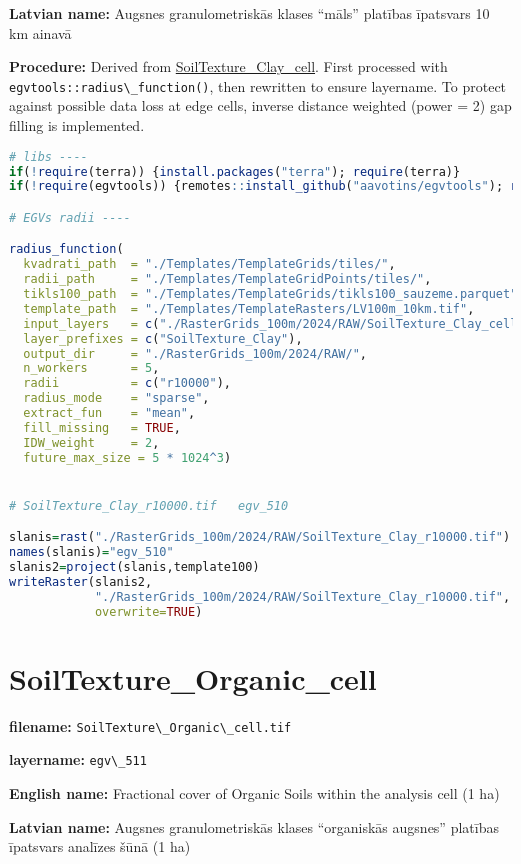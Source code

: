 \documentclass[
]{book}
\newcommand{\passthrough}[1]{#1}
\begin{document}
\textbf{Latvian name:} Augsnes granulometriskās klases ``māls'' platības īpatsvars 10 km ainavā

\textbf{Procedure:} Derived from \hyperref[ch06.506]{SoilTexture\_Clay\_cell}. First processed
with \passthrough{\lstinline!egvtools::radius\_function()!}, then rewritten to ensure layername. To protect against
possible data loss at edge cells, inverse distance weighted (power = 2) gap filling
is implemented.

\begin{lstlisting}[language=R]
# libs ----
if(!require(terra)) {install.packages("terra"); require(terra)}
if(!require(egvtools)) {remotes::install_github("aavotins/egvtools"); require(egvtools)}

# EGVs radii ----

radius_function(
  kvadrati_path  = "./Templates/TemplateGrids/tiles/",
  radii_path     = "./Templates/TemplateGridPoints/tiles/",
  tikls100_path  = "./Templates/TemplateGrids/tikls100_sauzeme.parquet",
  template_path  = "./Templates/TemplateRasters/LV100m_10km.tif",
  input_layers   = c("./RasterGrids_100m/2024/RAW/SoilTexture_Clay_cell.tif"),
  layer_prefixes = c("SoilTexture_Clay"),
  output_dir     = "./RasterGrids_100m/2024/RAW/",
  n_workers      = 5,
  radii          = c("r10000"),
  radius_mode    = "sparse",
  extract_fun    = "mean",
  fill_missing   = TRUE,
  IDW_weight     = 2,
  future_max_size = 5 * 1024^3)


# SoilTexture_Clay_r10000.tif   egv_510

slanis=rast("./RasterGrids_100m/2024/RAW/SoilTexture_Clay_r10000.tif")
names(slanis)="egv_510"
slanis2=project(slanis,template100)
writeRaster(slanis2,
            "./RasterGrids_100m/2024/RAW/SoilTexture_Clay_r10000.tif",
            overwrite=TRUE)
\end{lstlisting}

\section{SoilTexture\_Organic\_cell}\label{ch06.511}

\textbf{filename:} \passthrough{\lstinline!SoilTexture\_Organic\_cell.tif!}

\textbf{layername:} \passthrough{\lstinline!egv\_511!}

\textbf{English name:} Fractional cover of Organic Soils within the analysis cell (1 ha)

\textbf{Latvian name:} Augsnes granulometriskās klases ``organiskās augsnes'' platības īpatsvars analīzes šūnā (1 ha)
\end{document}

